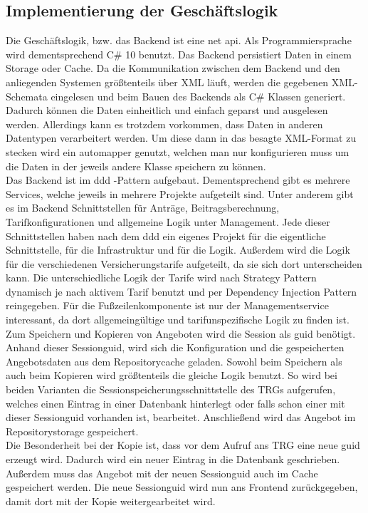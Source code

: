 \subsection{Implementierung der Geschäftslogik}
\label{geschaeftslogikimplementieren}
Die Geschäftslogik, bzw. das Backend ist eine \gls{net} \gls{api}. Als Programmiersprache wird dementsprechend C# 10 benutzt. Das Backend persistiert Daten in einem Storage oder Cache.  Da die Kommunikation zwischen dem Backend und den anliegenden Systemen größtenteils über XML läuft, werden die gegebenen XML-Schemata eingelesen und beim Bauen des Backends als C# Klassen generiert. Dadurch können die Daten einheitlich und einfach geparst und ausgelesen werden. Allerdings kann es trotzdem vorkommen, dass Daten in anderen Datentypen verarbeitert werden. Um diese dann in das besagte XML-Format zu stecken  wird ein \gls{automapper} genutzt, welchen man nur konfigurieren muss um die Daten in der jeweils andere Klasse speichern zu können.\\

Das Backend ist im \ac{ddd} -Pattern aufgebaut. Dementsprechend gibt es mehrere Services, welche jeweils in mehrere Projekte aufgeteilt sind. Unter anderem gibt es im Backend Schnittstellen für Anträge, Beitragsberechnung, Tarifkonfigurationen und allgemeine Logik unter Management. Jede dieser Schnittstellen haben nach dem \ac{ddd} ein eigenes Projekt für die eigentliche Schnittstelle, für die Infrastruktur und für die Logik. Außerdem wird die Logik für die verschiedenen Versicherungstarife aufgeteilt, da sie sich dort unterscheiden kann. Die unterschiedliche Logik der Tarife wird nach Strategy Pattern dynamisch je nach aktivem Tarif benutzt und per Dependency Injection Pattern reingegeben. Für die Fußzeilenkomponente ist nur der Managementservice interessant, da dort allgemeingültige und tarifunspezifische Logik zu finden ist.\\

Zum Speichern und Kopieren von Angeboten wird die Session als \ac{guid} benötigt. Anhand dieser Sessionguid, wird sich die Konfiguration und die gespeicherten Angebotsdaten aus dem Repositorycache geladen. Sowohl beim Speichern als auch beim Kopieren wird größtenteils die gleiche Logik benutzt. So wird bei beiden Varianten die Sessionspeicherungsschnittstelle des \ac{TRG}s aufgerufen, welches einen Eintrag in einer Datenbank hinterlegt oder falls schon einer mit dieser Sessionguid vorhanden ist, bearbeitet. Anschließend wird das Angebot im Repositorystorage gespeichert. \\ Die Besonderheit bei der Kopie ist, dass vor dem Aufruf ans \ac{TRG} eine neue \ac{guid} erzeugt wird. Dadurch wird ein neuer Eintrag in die Datenbank geschrieben. Außerdem muss das Angebot mit der neuen Sessionguid auch im Cache gespeichert werden. Die neue Sessionguid wird nun ans Frontend zurückgegeben, damit dort mit der Kopie weitergearbeitet wird.\\

